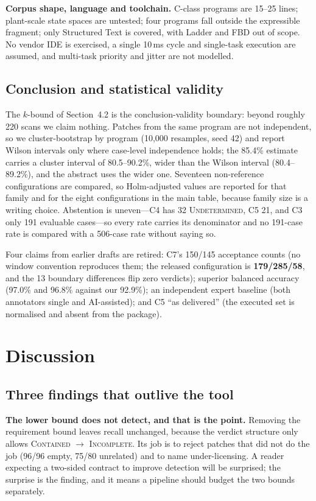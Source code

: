 \documentclass[acmsmall,screen,review,anonymous]{acmart}
\begin{document}
\textbf{Corpus shape, language and toolchain.} C-class programs are 15--25 lines; plant-scale state spaces are untested; four programs fall outside the expressible fragment; only Structured Text is covered, with Ladder and FBD out of scope. No vendor IDE is exercised, a single 10\,ms cycle and single-task execution are assumed, and multi-task priority and jitter are not modelled.

\subsection{Conclusion and statistical validity}

The $k$-bound of Section~4.2 is the conclusion-validity boundary: beyond roughly 220 scans we claim nothing. Patches from the same program are not independent, so we cluster-bootstrap by program (10,000 resamples, seed 42) and report Wilson intervals only where case-level independence holds; the 85.4\% estimate carries a cluster interval of 80.5--90.2\%, wider than the Wilson interval (80.4--89.2\%), and the abstract uses the wider one. Seventeen non-reference configurations are compared, so Holm-adjusted values are reported for that family and for the eight configurations in the main table, because family size is a writing choice. Abstention is uneven---C4 has 32 \textsc{Undetermined}, C5 21, and C3 only 191 evaluable cases---so every rate carries its denominator and no 191-case rate is compared with a 506-case rate without saying so.

Four claims from earlier drafts are retired: C7's 150/145 acceptance counts (no window convention reproduces them; the released configuration is \textbf{179/285/58}, and the 13 boundary differences flip zero verdicts); superior balanced accuracy (97.0\% and 96.8\% against our 92.9\%); an independent expert baseline (both annotators single and AI-assisted); and C5 ``as delivered'' (the executed set is normalised and absent from the package).

\section{Discussion}
\label{sec:discussion}

\subsection{Three findings that outlive the tool}

\textbf{The lower bound does not detect, and that is the point.} Removing the requirement bound leaves recall unchanged, because the verdict structure only allows \textsc{Contained} $\to$ \textsc{Incomplete}. Its job is to reject patches that did not do the job (96/96 empty, 75/80 unrelated) and to name under-licensing. A reader expecting a two-sided contract to improve detection will be surprised; the surprise is the finding, and it means a pipeline should budget the two bounds separately.
\end{document}
